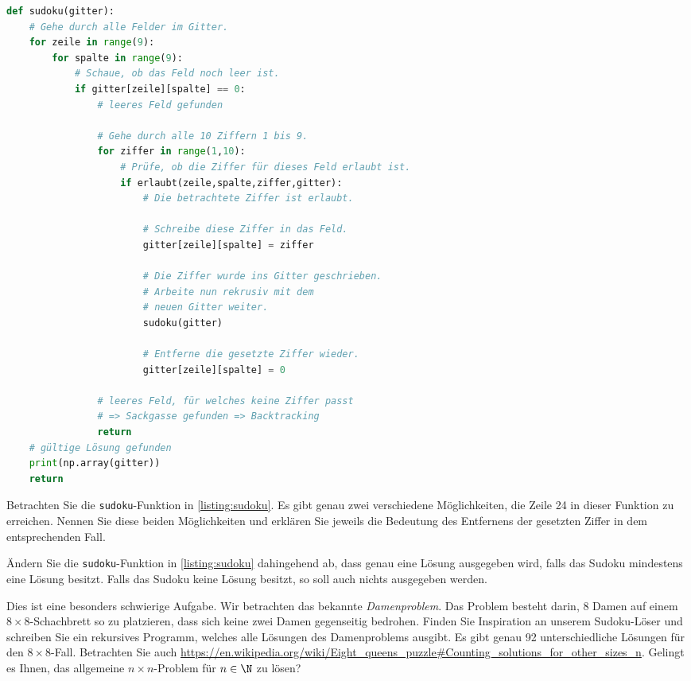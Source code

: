 \lstset{style=BaselineStyle}
\begin{lstlisting}[language=Python,caption=Implementation der Funktion \lstinline|sudoku|,label=listing:sudoku]
def sudoku(gitter):
	# Gehe durch alle Felder im Gitter.
	for zeile in range(9):
		for spalte in range(9):
			# Schaue, ob das Feld noch leer ist.
			if gitter[zeile][spalte] == 0:
				# leeres Feld gefunden

				# Gehe durch alle 10 Ziffern 1 bis 9.
				for ziffer in range(1,10):
					# Prüfe, ob die Ziffer für dieses Feld erlaubt ist.
					if erlaubt(zeile,spalte,ziffer,gitter):
						# Die betrachtete Ziffer ist erlaubt.

						# Schreibe diese Ziffer in das Feld.
						gitter[zeile][spalte] = ziffer

						# Die Ziffer wurde ins Gitter geschrieben.
						# Arbeite nun rekrusiv mit dem
						# neuen Gitter weiter.
						sudoku(gitter)

						# Entferne die gesetzte Ziffer wieder.
						gitter[zeile][spalte] = 0

				# leeres Feld, für welches keine Ziffer passt
				# => Sackgasse gefunden => Backtracking
				return
	# gültige Lösung gefunden
	print(np.array(gitter))
	return
\end{lstlisting}

\begin{myexercise}\label{myexercise:0681}
	Betrachten Sie die \lstinline|sudoku|-Funktion in \cref{listing:sudoku}. Es gibt genau zwei verschiedene Möglichkeiten, die Zeile 24 in dieser Funktion zu erreichen. Nennen Sie diese beiden Möglichkeiten und erklären Sie jeweils die Bedeutung des Entfernens der gesetzten Ziffer in dem entsprechenden Fall.
\end{myexercise}

\begin{myexercise}\label{myexercise:0603}
	Ändern Sie die \lstinline|sudoku|-Funktion in \cref{listing:sudoku} dahingehend ab, dass genau eine Lösung ausgegeben wird, falls das Sudoku mindestens eine Lösung besitzt. Falls das Sudoku keine Lösung besitzt, so soll auch nichts ausgegeben werden.
\end{myexercise}

\begin{myexercise}\label{myexercise:0604}
	Dies ist eine besonders schwierige Aufgabe. Wir betrachten das bekannte \textit{Damenproblem}. Das Problem besteht darin, 8 Damen auf einem $8\times 8$-Schachbrett so zu platzieren, dass sich keine zwei Damen gegenseitig bedrohen. Finden Sie Inspiration an unserem Sudoku-Löser und schreiben Sie ein rekursives Programm, welches alle Lösungen des Damenproblems ausgibt. Es gibt genau 92 unterschiedliche Lösungen für den $8\times 8$-Fall. Betrachten Sie auch \url{https://en.wikipedia.org/wiki/Eight\_queens\_puzzle#Counting\_solutions\_for\_other\_sizes\_n}. Gelingt es Ihnen, das allgemeine $n\times n$-Problem für $n\in\N$ zu lösen?
\end{myexercise}

